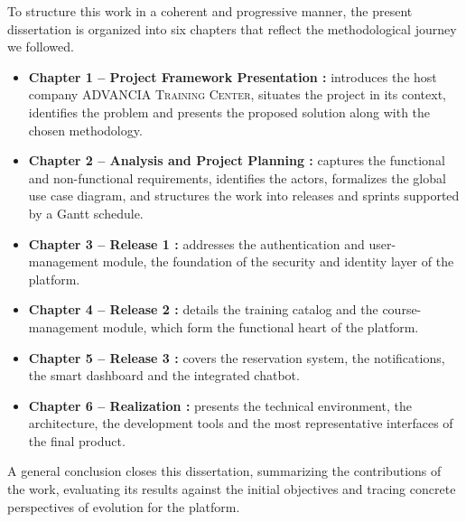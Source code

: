 \medskip
\noindent
To structure this work in a coherent and progressive manner, the present dissertation is organized into six chapters that reflect the methodological journey we followed.

\begin{itemize}[leftmargin=2.2em,itemsep=0.4em]
  \item \textbf{Chapter 1 -- Project Framework Presentation :} introduces the host company \textsc{ADVANCIA Training Center}, situates the project in its context, identifies the problem and presents the proposed solution along with the chosen methodology.
  \item \textbf{Chapter 2 -- Analysis and Project Planning :} captures the functional and non-functional requirements, identifies the actors, formalizes the global use case diagram, and structures the work into releases and sprints supported by a Gantt schedule.
  \item \textbf{Chapter 3 -- Release 1 :} addresses the authentication and user-management module, the foundation of the security and identity layer of the platform.
  \item \textbf{Chapter 4 -- Release 2 :} details the training catalog and the course-management module, which form the functional heart of the platform.
  \item \textbf{Chapter 5 -- Release 3 :} covers the reservation system, the notifications, the smart dashboard and the integrated chatbot.
  \item \textbf{Chapter 6 -- Realization :} presents the technical environment, the architecture, the development tools and the most representative interfaces of the final product.
\end{itemize}

\medskip
\noindent
A general conclusion closes this dissertation, summarizing the contributions of the work, evaluating its results against the initial objectives and tracing concrete perspectives of evolution for the platform.

\cleardoublepage
